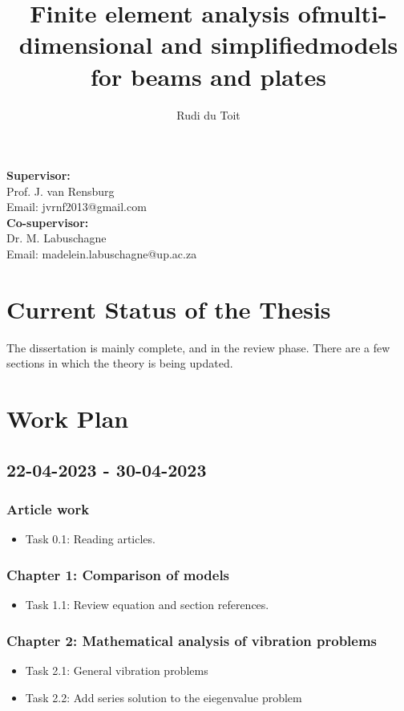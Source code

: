 \documentclass[12pt, a4paper]{article}
\title{Finite element analysis ofmulti-dimensional and simplifiedmodels for beams and plates}
\author{Rudi du Toit}
\date{}
\begin{document}
\maketitle

\noindent
\textbf{Supervisor:} \\
Prof. J. van Rensburg \\
Email: jvrnf2013@gmail.com \\

\noindent
\textbf{Co-supervisor:} \\
Dr. M. Labuschagne  \\
Email: madelein.labuschagne@up.ac.za \\

\section*{Current Status of the Thesis}
The dissertation is mainly complete, and in the review phase. There are a few sections in which the theory is being updated.

\section*{Work Plan}
\subsection*{22-04-2023 - 30-04-2023}
\subsubsection*{Article work}
\begin{itemize}[label=\Square]
  \item Task 0.1: Reading articles.
\end{itemize}

\subsubsection*{Chapter 1: Comparison of models}
\begin{itemize}[label=\Square]
  \item Task 1.1: Review equation and section references.
\end{itemize}

\subsubsection*{Chapter 2: Mathematical analysis of vibration problems}
\begin{itemize}[label=\Square]
  \item Task 2.1: General vibration problems
  \item Task 2.2: Add series solution to the eiegenvalue problem
\end{itemize}
\end{document}
